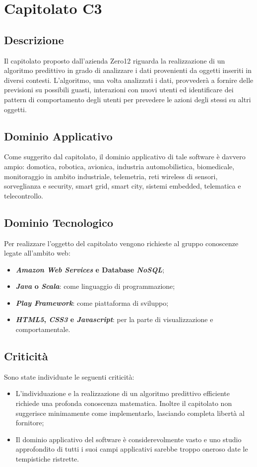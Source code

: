 \newpage
\section{Capitolato C3}
\subsection{Descrizione}
Il capitolato proposto dall'azienda Zero12 riguarda la realizzazione di un algoritmo predittivo in grado di analizzare i dati provenienti da oggetti inseriti in diversi contesti. L'algoritmo, una volta analizzati i dati, provvederà a fornire delle previsioni su possibili guasti, interazioni con nuovi utenti ed identificare dei pattern di comportamento degli utenti per prevedere le azioni degli stessi su altri oggetti.

\subsection{Dominio Applicativo}
Come suggerito dal capitolato, il dominio applicativo di tale software è davvero ampio: domotica, robotica, avionica, industria automobilistica, biomedicale, monitoraggio in ambito industriale, telemetria, reti wireless di sensori, sorveglianza e security, smart grid, smart city, sistemi embedded, telematica e telecontrollo.

\subsection{Dominio Tecnologico}
Per realizzare l'oggetto del capitolato vengono richieste al gruppo conoscenze legate all'ambito web:
\begin{itemize}
\item \textbf{\textit{Amazon Web Services} e Database \textit{ NoSQL}};
\item \textbf{\textit{Java} o \textit{Scala}}: come linguaggio di programmazione;
\item \textbf{\textit{Play Framework}}: come piattaforma di sviluppo;
\item \textbf{\textit{HTML5}, \textit{CSS3} e \textit{Javascript}}: per la parte di visualizzazione e comportamentale.
\end{itemize}

\subsection{Criticità}
Sono state individuate le seguenti criticità:
\begin{itemize}
\item L'individuazione e la realizzazione di un algoritmo predittivo efficiente richiede una profonda conoscenza matematica. Inoltre il capitolato non suggerisce minimamente come implementarlo, lasciando completa libertà al fornitore;
\item Il dominio applicativo del software è considerevolmente vasto e uno studio approfondito di tutti i suoi campi applicativi sarebbe troppo oneroso date le tempistiche ristrette.
\end{itemize}

